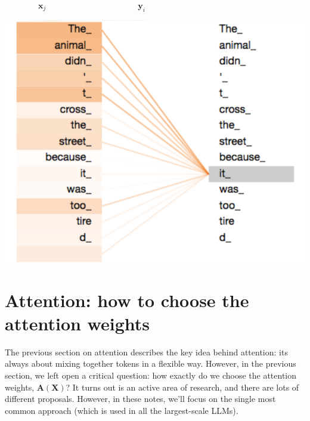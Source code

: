 \documentclass{article}
\newcommand{\x}{\mathbf{x}}
\newcommand{\y}{\mathbf{y}}
\newcommand{\A}{\mathbf{A}}
\newcommand{\X}{\mathbf{X}}
\begin{document}
\begin{center}
\begin{minipage}{0.6\textwidth}
  $\quad \quad \quad \quad \x_j \quad\quad\quad\quad \quad \quad \quad \quad \quad \quad \quad \y_i$

  \includegraphics[width=\textwidth]{self_attention_crop}
\end{minipage}
\end{center}

\section{Attention: how to choose the attention weights}

The previous section on attention describes the key idea behind attention: its always about mixing together tokens in a flexible way.
However, in the previous section, we left open a critical question: how exactly do we choose the attention weights, $\A(\X)$?
It turns out is an active area of research, and there are lots of different proposals.
However, in these notes, we'll focus on the single most common approach (which is used in all the largest-scale LLMs).
\end{document}
